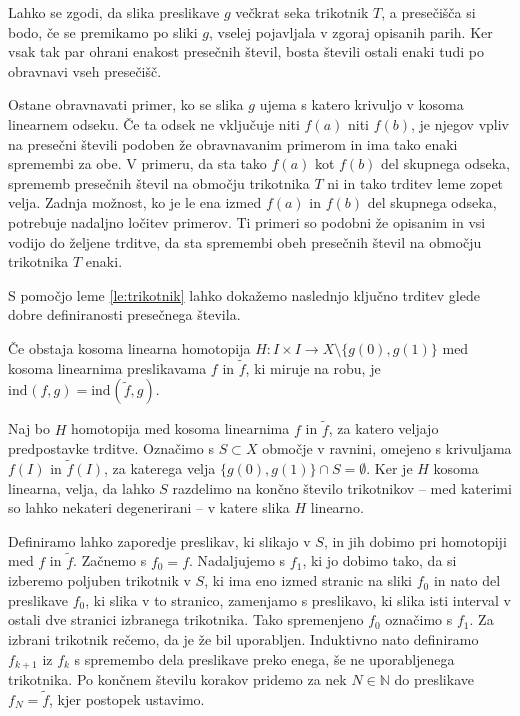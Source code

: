 \documentclass[mat1]{fmfdelo}
\newcommand{\N}{\mathbb N}
\newcommand{\ind}[3][]{\text{ind}_{#1}(#2, #3)}
\begin{document}
Lahko se zgodi, da slika preslikave $g$ večkrat seka trikotnik $T$, a presečišča si bodo, če se premikamo po sliki $g$, vselej pojavljala v zgoraj opisanih parih. Ker vsak tak par ohrani enakost presečnih števil, bosta števili ostali enaki tudi po obravnavi vseh presečišč.

Ostane obravnavati primer, ko se slika $g$ ujema s katero krivuljo v kosoma linearnem odseku. Če ta odsek ne vključuje niti $f(a)$ niti $f(b)$, je njegov vpliv na presečni števili podoben že obravnavanim primerom in ima tako enaki spremembi za obe. V primeru, da sta tako $f(a)$ kot $f(b)$ del skupnega odseka, sprememb presečnih števil na območju trikotnika $T$ ni in tako trditev leme zopet velja. Zadnja možnost, ko je le ena izmed $f(a)$ in $f(b)$ del skupnega odseka, potrebuje nadaljno ločitev primerov. Ti primeri so podobni že opisanim in vsi vodijo do željene trditve, da sta spremembi obeh presečnih števil na območju trikotnika $T$ enaki.
\endproof

S pomočjo leme \ref{le:trikotnik} lahko dokažemo naslednjo ključno trditev glede dobre definiranosti presečnega števila.
\begin{trditev}
Če obstaja kosoma linearna homotopija $H\colon I \times I \to X \setminus \{g(0), g(1)\}$ med kosoma linearnima preslikavama $f$ in $\widetilde{f}$, ki miruje na robu, je $\ind{f}{g} = \ind{\widetilde{f}}{g}$.
\end{trditev}
\proof
Naj bo $H$ homotopija med kosoma linearnima $f$ in $\widetilde{f}$, za katero veljajo predpostavke trditve. Označimo s $S\subset X$ območje v ravnini, omejeno s krivuljama $f(I)$ in $\widetilde{f}(I)$, za katerega velja $\{g(0), g(1)\} \cap S = \emptyset$. Ker je $H$ kosoma linearna, velja, da lahko $S$ razdelimo na končno število trikotnikov -- med katerimi so lahko nekateri degenerirani -- v katere slika $H$ linearno. 

Definiramo lahko zaporedje preslikav, ki slikajo v $S$, in jih dobimo pri homotopiji med $f$ in $\widetilde{f}$. Začnemo s $f_0 = f$. Nadaljujemo s $f_1$, ki jo dobimo tako, da si izberemo poljuben trikotnik v $S$, ki ima eno izmed stranic na sliki $f_0$ in nato del preslikave $f_0$, ki slika v to stranico, zamenjamo s preslikavo, ki slika isti interval v ostali dve stranici izbranega trikotnika. Tako spremenjeno $f_0$ označimo s $f_1$. Za izbrani trikotnik rečemo, da je že bil uporabljen. Induktivno nato definiramo $f_{k+1}$ iz $f_k$ s spremembo dela preslikave preko enega, še ne uporabljenega trikotnika. Po končnem številu korakov pridemo za nek $N \in \N$ do preslikave $f_N = \widetilde{f}$, kjer postopek ustavimo.
\end{document}
